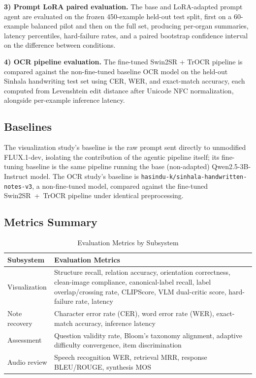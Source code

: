 \documentclass[conference]{IEEEtran}
\begin{document}
\textbf{3) Prompt LoRA paired evaluation.} The base and LoRA-adapted prompt agent are evaluated on the frozen 450-example held-out test split, first on a 60-example balanced pilot and then on the full set, producing per-organ summaries, latency percentiles, hard-failure rates, and a paired bootstrap confidence interval on the difference between conditions.

\textbf{4) OCR pipeline evaluation.} The fine-tuned Swin2SR + TrOCR pipeline is compared against the non-fine-tuned baseline OCR model on the held-out Sinhala handwriting test set using CER, WER, and exact-match accuracy, each computed from Levenshtein edit distance after Unicode NFC normalization, alongside per-example inference latency.

\subsection{Baselines}

The visualization study's baseline is the raw prompt sent directly to unmodified FLUX.1-dev, isolating the contribution of the agentic pipeline itself; its fine-tuning baseline is the same pipeline running the base (non-adapted) Qwen2.5-3B-Instruct model. The OCR study's baseline is \texttt{hasindu-k/sinhala-handwritten-notes-v3}, a non-fine-tuned model, compared against the fine-tuned Swin2SR~+~TrOCR pipeline under identical preprocessing.

\subsection{Metrics Summary}

\begin{table}[t]
\caption{Evaluation Metrics by Subsystem}
\label{tab:metrics}
\centering
\begin{tabular}{p{1.7cm} p{6.0cm}}
\toprule
\textbf{Subsystem} & \textbf{Evaluation Metrics} \\
\midrule
Visualization & Structure recall, relation accuracy, orientation correctness, clean-image compliance, canonical-label recall, label overlap/crossing rate, CLIPScore, VLM dual-critic score, hard-failure rate, latency \\
Note recovery & Character error rate (CER), word error rate (WER), exact-match accuracy, inference latency \\
Assessment & Question validity rate, Bloom's taxonomy alignment, adaptive difficulty convergence, item discrimination \\
Audio review & Speech recognition WER, retrieval MRR, response BLEU/ROUGE, synthesis MOS \\
\bottomrule
\end{tabular}
\end{table}
\end{document}
